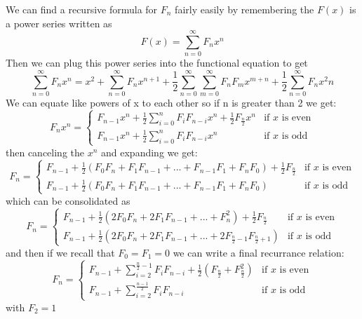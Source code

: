 \documentclass{article}
\begin{document}
We can find a recursive formula for \(F_n\) fairly easily by remembering the \(F(x)\) is a power series written as 
\begin{equation}
F(x)=\sum_{n=0}^\infty F_nx^n
\end{equation}
Then we can plug this power series into the functional equation to get
\begin{equation}
\sum_{n=0}^\infty F_nx^n=x^2+\sum_{n=0}^\infty F_nx^{n+1}+\frac{1}{2}\sum_{n=0}^\infty \sum_{m=0}^\infty F_n F_mx^{m+n}+\frac{1}{2}\sum_{n=0}^\infty F_nx^2n
\end{equation}
We can equate like powers of x to each other so if n is greater than 2 we get:
\begin{equation}
F_nx^n=
\begin{cases}
F_{n-1}x^n+\frac{1}{2}\sum_{i=0}^nF_iF_{n-i}x^n+\frac{1}{2}F_{\frac{n}{2}}x^n &\text{if } x \text{ is even} \\
F_{n-1}x^n+\frac{1}{2}\sum_{i=0}^nF_iF_{n-i}x^n & \text{if }x \text{ is odd} 
\end{cases}
\end{equation}
then canceling the \(x^n\) and expanding we get:
\begin{equation}
F_n=
\begin{cases}
F_{n-1}+ \frac{1}{2}(F_0F_n+F_1F_{n-1}+...+F_{n-1}F_1+F_nF_0)+\frac{1}{2}F_{\frac{n}{2}} &\text{if } x \text{ is even} \\
F_{n-1}+\frac{1}{2} (F_0F_n+F_1F_{n-1}+...+F_{n-1}F_1+F_nF_0) & \text{if }x \text{ is odd} 
\end{cases}
\end{equation}
which can be consolidated as
\begin{equation}
F_n=
\begin{cases}
F_{n-1}+ \frac{1}{2}(2F_0F_n+2F_1F_{n-1}+...+F_n^2)+\frac{1}{2}F_{\frac{n}{2}} &\text{if } x \text{ is even} \\
F_{n-1}+\frac{1}{2} (2F_0F_n+2F_1F_{n-1}+...+2F_{\frac{n}{2}-1}F_{\frac{n}{2}+1}) & \text{if }x \text{ is odd} 
\end{cases}
\end{equation}
and then if we recall that \(F_0=F_1=0\) we can write a final recurrance relation:
\begin{equation}
F_n=
\begin{cases}
F_{n-1}+\sum_{i=2}^{\frac{n}{2}-1}F_iF_{n-i}+\frac{1}{2}(F_{\frac{n}{2}}+F_{\frac{n}{2}}^2) &\text{if } x \text{ is even} \\
F_{n-1}+\sum_{i=2}^{\frac{n-1}{2}}F_iF_{n-i} & \text{if }x \text{ is odd} 
\end{cases}
\end{equation}
with \(F_2=1\)
\end{document}
